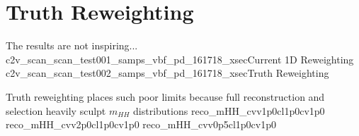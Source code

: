 \section{Truth Reweighting}

{The results are not inspiring...}
{c2v_scan_scan_test001_samps_vbf_pd_161718_xsec}{Current 1D Reweighting}
{c2v_scan_scan_test002_samps_vbf_pd_161718_xsec}{Truth Reweighting}


{   
    Truth reweighting places such poor limits because 
    full reconstruction and selection heavily sculpt $m_{HH}$ distributions
}
{reco_mHH_cvv1p0cl1p0cv1p0}
{reco_mHH_cvv2p0cl1p0cv1p0}
{reco_mHH_cvv0p5cl1p0cv1p0}
